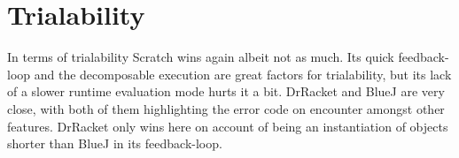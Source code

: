 \section{Trialability}
\label{sec:trialability}
In terms of trialability Scratch wins again albeit not as much.
Its quick feedback-loop and the decomposable execution are great factors for trialability, but its lack of a slower runtime evaluation mode hurts it a bit.
DrRacket and BlueJ are very close, with both of them highlighting the error code on encounter amongst other features.
DrRacket only wins here on account of being an instantiation of objects shorter than BlueJ in its feedback-loop.